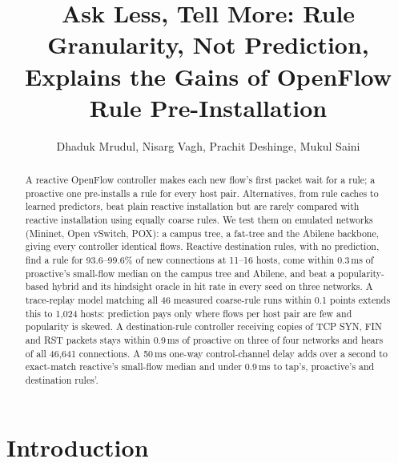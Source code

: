 \documentclass[sigconf]{acmart}
\begin{document}
\title{Ask Less, Tell More: Rule Granularity, Not Prediction, Explains the Gains of OpenFlow Rule Pre-Installation}

\author{Dhaduk Mrudul, Nisarg Vagh, Prachit Deshinge, Mukul Saini}
\renewcommand{\shortauthors}{Dhaduk, Vagh, Deshinge and Saini}

\begin{abstract}
A reactive OpenFlow controller makes each new flow's first packet wait for a rule; a proactive one pre-installs a rule for every host pair. Alternatives, from rule caches to learned predictors, beat plain reactive installation but are rarely compared with reactive installation using equally coarse rules. We test them on emulated networks (Mininet, Open vSwitch, POX): a campus tree, a fat-tree and the Abilene backbone, giving every controller identical flows. Reactive destination rules, with no prediction, find a rule for 93.6--99.6\% of new connections at 11--16 hosts, come within 0.3\,ms of proactive's small-flow median on the campus tree and Abilene, and beat a popularity-based hybrid and its hindsight oracle in hit rate in every seed on three networks. A trace-replay model matching all 46 measured coarse-rule runs within 0.1 points extends this to 1,024 hosts: prediction pays only where flows per host pair are few and popularity is skewed. A destination-rule controller receiving copies of TCP SYN, FIN and RST packets stays within 0.9\,ms of proactive on three of four networks and hears of all 46,641 connections. A 50\,ms one-way control-channel delay adds over a second to exact-match reactive's small-flow median and under 0.9\,ms to tap's, proactive's and destination rules'.
\end{abstract}


\maketitle

\section{Introduction}
\end{document}
